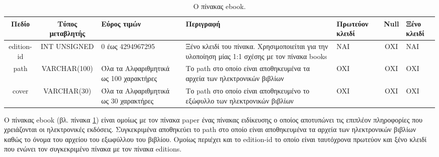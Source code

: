 \documentclass{assignment}
\begin{document}
\begin{landscape}
\begin{table}[htbp]
\begin{center}
  \begin{tabular}{|c|c|m{}|m{}|m{2.0cm}|c|m{1.5cm}|}
    \hline
    {\bf Πεδίο} & {\bf Τύπος μεταβλητής} & {\bf Εύρος τιμών} & {\bf Περιγραφή} & {\bf Πρωτεύον κλειδί} & {\bf Null} & {\bf Ξένο κλειδί} \\ \hline
    edition-id & INT UNSIGNED & 0 έως 4294967295 & Ξένο κλειδί του πίνακα. Χρησιμοποιείται για την υλοποίηση μίας 1:1 σχέσης με τον πίνακα books & ΝΑΙ & ΟΧΙ & NAI \\ \hline
    path & VARCHAR(100) &  Όλα τα Αλφαριθμητικά ως 100 χαρακτήρες & Το path στο οποίο είναι αποθηκευμένα τα αρχεία των ηλεκτρονικών βιβλίων & OXI & ΟΧΙ & ΟΧΙ \\ \hline
    cover & VARCHAR(30) &  Όλα τα Αλφαριθμητικά ως 30 χαρακτήρες & Το path στο οποίο είναι αποθηκευμένο το εξώφυλλο των ηλεκτρονικών βιβλίων & OXI & ΟΧΙ & ΟΧΙ \\ \hline
  \end{tabular}
\caption{Ο πίνακας ebook.}
\label{table:db_table:ebook}
\end{center}
\end{table}

Ο πίνακας ebook (βλ. πίνακα \ref{table:db_table:ebook}) είναι ομοίως με τον πίνακα paper ένας πίνακας ειδίκευσης ο οποίος αποτυπώνει τις επιπλέον πληροφορίες που χρειάζονται οι ηλεκτρονικές εκδόσεις. Συγκεκριμένα αποθηκεύει το path στο οποίο είναι αποθηκευμένα τα αρχεία των ηλεκτρονικών βιβλίων καθώς το όνομα του αρχείου του εξωφύλλου του βιβλίου. Ομοίως περιέχει και το edition-id το οποίο είναι ταυτόχρονα πρωτεύον και ξένο κλειδί που ενώνει τον συγκεκριμένο πίνακα με τον πίνακα editions. 
\end{landscape}
\end{document}
